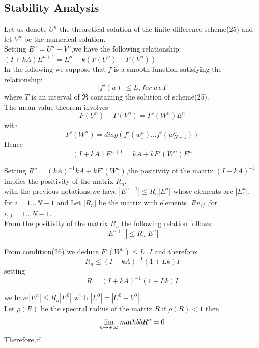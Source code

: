 \documentclass[12pt]{article}
\numberwithin{equation}{section} %
\begin{document}
\subsection{Stability Analysis}
Let us denote $U^n$ the theoretical solution of the finite
difference scheme(25) and let $V^n$ be the numerical solution.\\
Setting $E^n=U^n-V^n$,we have the following relationship:\\
$(I+kA)E^{n+1}=E^n +k(F(U^n)-F(V^n))$\\
In the following we suppose that $f$ is a smooth function satisfying
the relationship:\\
\begin{equation}
|f'(u)|\leq L,  for \: u \, \epsilon \,T
\end{equation}
 where $T$ is an interval of $\Re$ containing the solution of scheme(25).\\
The mean value theorem involves\\
\begin{equation*}
F(U^n)-F(V^n)=F'(W^n)E^n
\end{equation*}
with
\begin{equation*}
F'(W^n)=diag(f'(w_1^n)...f'(w^n_{N-1}))
\end{equation*}
Hence
\begin{equation*}
 (I+kA)E^{n+1}=kA+kF'(W^n)E^n
 \end{equation*}

Setting $R^n=(kA)^{-1}kA + kF'(W^n)$,the positivity of the matrix
$(I+kA)^{-1}$ implies the positivity of the matrix $R_n$.\\
with the previous notations,we have $|E^{n+1}|\leq R_n|E^n|$ whose
elements are $|E^n_1|$, for $i=1...N-1$ and Let $|R_n| $ be the
matrix with elements $|Rn_{ij}|$,for $i,j=1...N-1$.\\
From the positivity of the matrix $R_n$ the following relation
follows:
\begin{equation*}
|E^{n+1}|\leq R_n|E^n|
\end{equation*}

From condition(26) we deduce $F'(W^n)\leq L\cdot I $ and therefore:
\begin{equation*}
R_n\leq(I+kA)^{-1}(1+Lk)I
\end{equation*}
setting
\begin{equation*}
R=(I+kA)^{-1}(1+Lk)I
\end{equation*}

we have$|E^{n}|\leq R_n|E^0|$ with $|E^0|=|U^0-V^0|$.\\
Let $\rho(R)$ be the spectral radius of the matrix $R$.if
$\rho(R)<1$ then
\begin{equation*}
\lim_{n \rightarrow +\infty} \\mathbb{R}^{n} = 0
\end{equation*}
Therefore,if
\end{document}

